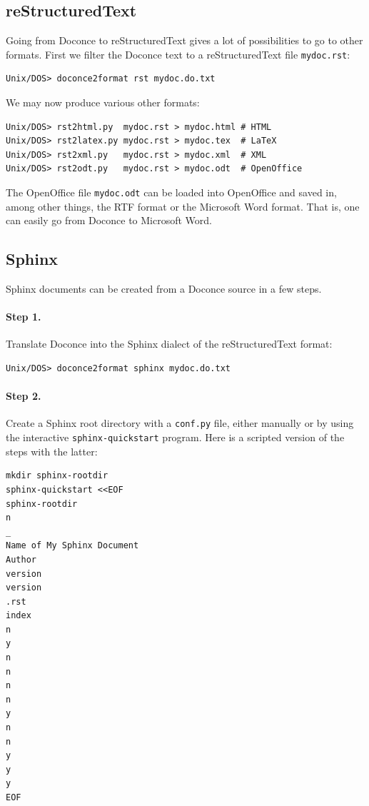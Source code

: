 \documentclass{article}
\begin{document}
\subsection{reStructuredText}

Going from Doconce to reStructuredText gives a lot of possibilities to
go to other formats. First we filter the Doconce text to a
reStructuredText file {\fontsize{10pt}{10pt}\verb!mydoc.rst!}:
\begin{Verbatim}[fontsize=\fontsize{9pt}{9pt},tabsize=8,baselinestretch=0.85,
fontfamily=tt,xleftmargin=7mm]
Unix/DOS> doconce2format rst mydoc.do.txt
\end{Verbatim}
\noindent
We may now produce various other formats:
\begin{Verbatim}[fontsize=\fontsize{9pt}{9pt},tabsize=8,baselinestretch=0.85,
fontfamily=tt,xleftmargin=7mm]
Unix/DOS> rst2html.py  mydoc.rst > mydoc.html # HTML
Unix/DOS> rst2latex.py mydoc.rst > mydoc.tex  # LaTeX
Unix/DOS> rst2xml.py   mydoc.rst > mydoc.xml  # XML
Unix/DOS> rst2odt.py   mydoc.rst > mydoc.odt  # OpenOffice
\end{Verbatim}
\noindent
The OpenOffice file {\fontsize{10pt}{10pt}\verb!mydoc.odt!} can be loaded into OpenOffice and
saved in, among other things, the RTF format or the Microsoft Word format.
That is, one can easily go from Doconce to Microsoft Word.

\subsection{Sphinx}

Sphinx documents can be created from a Doconce source in a few steps.

\paragraph{Step 1.}
Translate Doconce into the Sphinx dialect of
the reStructuredText format:
\begin{Verbatim}[fontsize=\fontsize{9pt}{9pt},tabsize=8,baselinestretch=0.85,
fontfamily=tt,xleftmargin=7mm]
Unix/DOS> doconce2format sphinx mydoc.do.txt
\end{Verbatim}
\noindent

\paragraph{Step 2.}
Create a Sphinx root directory with a {\fontsize{10pt}{10pt}\verb!conf.py!} file, 
either manually or by using the interactive {\fontsize{10pt}{10pt}\verb!sphinx-quickstart!}
program. Here is a scripted version of the steps with the latter:
\begin{Verbatim}[fontsize=\fontsize{9pt}{9pt},tabsize=8,baselinestretch=0.85,
fontfamily=tt,xleftmargin=7mm]
mkdir sphinx-rootdir
sphinx-quickstart <<EOF
sphinx-rootdir
n
_
Name of My Sphinx Document
Author
version
version
.rst
index
n
y
n
n
n
n
y
n
n
y
y
y
EOF
\end{Verbatim}
\noindent
\end{document}
